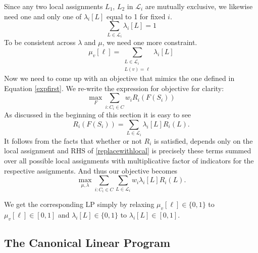 Since any two local assignments $L_1$, $L_2$ in $ \mathcal{L}_i$ are mutually exclusive, we likewise need one and only one of $\lambda_i[L]$ equal to 1 for fixed $i$.
\begin{equation}\label{lambsum}
\sum_{L \in \mathcal{L}_i} \lambda_i[L] = 1 
\end{equation}\label{mulambcons}
To be consistent across $\lambda$ and $\mu$, we need one more constraint.
\begin{equation}
\mu_v[\ell] = \sum_{\substack{ L \in \mathcal{L}_i \\ L(v) = \ell }} \lambda_i[L] 
\end{equation}
Now we need to come up with an objective that mimics the one defined in Equation \ref{expfirst}. We re-write the expression for objective for clarity: 
$$\max_F \sum_{i:C_i \in C} w_i R_i(F(S_i))$$
As discussed in the beginning of this section it is easy to see 
\begin{equation}\label{replacewithlocal}
R_i(F(S_i)) = \sum_{L\in \mathcal L_i}\lambda_i[L] R_i(L).
\end{equation} 
It follows from the facts that whether or not $R_i$ is satisfied, depends only on the local assignment and RHS of \ref{replacewithlocal} is precisely these terms summed over all possible local assignments with multiplicative factor of indicators for the respective assignments. And thus our objective becomes 
\begin{equation}\label{glbobj}
\max_{\mu, \lambda} \sum_{i : C_i \in C} \sum_{L \in \mathcal{L}_i}   w_i\lambda_i[L] R_i(L).
\end{equation}

We get the corresponding LP simply by relaxing $\mu_v[\ell] \in \{0,1\}$ to $\mu_v[\ell] \in [0,1]$ and $\lambda_i[L] \in \{0,1\}$ to $\lambda_i[L] \in [0,1]$.


\subsection{The Canonical Linear Program}

